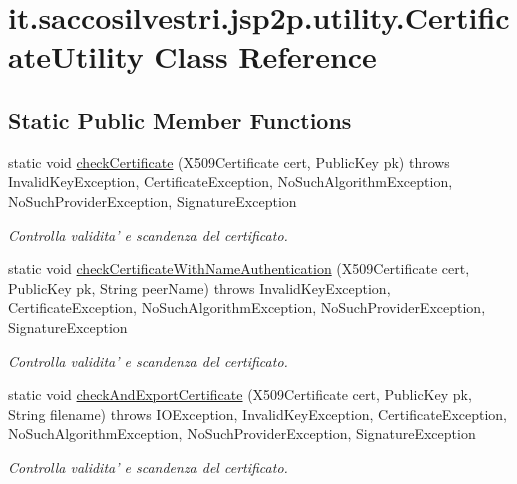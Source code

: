 \hypertarget{classit_1_1saccosilvestri_1_1jsp2p_1_1utility_1_1_certificate_utility}{
\section{it.saccosilvestri.jsp2p.utility.\-Certificate\-Utility \-Class \-Reference}
\label{classit_1_1saccosilvestri_1_1jsp2p_1_1utility_1_1_certificate_utility}
}
\subsection*{\-Static \-Public \-Member \-Functions}
\begin{DoxyCompactItemize}
\item 
static void \hyperlink{classit_1_1saccosilvestri_1_1jsp2p_1_1utility_1_1_certificate_utility_aab387b79ca2c81278dd91c33fd4419cf}{check\-Certificate} (\-X509\-Certificate cert, \-Public\-Key pk)  throws Invalid\-Key\-Exception, Certificate\-Exception, 			\-No\-Such\-Algorithm\-Exception, No\-Such\-Provider\-Exception, 			\-Signature\-Exception 
\begin{DoxyCompactList}\small\item\em \-Controlla validita' e scandenza del certificato. \end{DoxyCompactList}\item 
static void \hyperlink{classit_1_1saccosilvestri_1_1jsp2p_1_1utility_1_1_certificate_utility_ae9125e02718ab76b0018b216f918a001}{check\-Certificate\-With\-Name\-Authentication} (\-X509\-Certificate cert, \-Public\-Key pk, \-String peer\-Name)  throws Invalid\-Key\-Exception, Certificate\-Exception, No\-Such\-Algorithm\-Exception, No\-Such\-Provider\-Exception, Signature\-Exception
\begin{DoxyCompactList}\small\item\em \-Controlla validita' e scandenza del certificato. \end{DoxyCompactList}\item 
static void \hyperlink{classit_1_1saccosilvestri_1_1jsp2p_1_1utility_1_1_certificate_utility_ae7d954ab296416a70fad0d335d1168f2}{check\-And\-Export\-Certificate} (\-X509\-Certificate cert, \-Public\-Key pk, \-String filename)  throws I\-O\-Exception, 			\-Invalid\-Key\-Exception, Certificate\-Exception, 			\-No\-Such\-Algorithm\-Exception, No\-Such\-Provider\-Exception, 			\-Signature\-Exception 
\begin{DoxyCompactList}\small\item\em \-Controlla validita' e scandenza del certificato. \end{DoxyCompactList}\item 

\end{DoxyCompactItemize}
